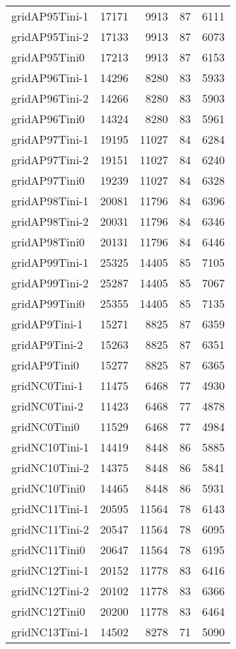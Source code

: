 \begin{longtable}{lrrrr}
gridAP95Tini-1 & 17171 & 9913 & 87 & 6111 \\
gridAP95Tini-2 & 17133 & 9913 & 87 & 6073 \\
gridAP95Tini0 & 17213 & 9913 & 87 & 6153 \\
gridAP96Tini-1 & 14296 & 8280 & 83 & 5933 \\
gridAP96Tini-2 & 14266 & 8280 & 83 & 5903 \\
gridAP96Tini0 & 14324 & 8280 & 83 & 5961 \\
gridAP97Tini-1 & 19195 & 11027 & 84 & 6284 \\
gridAP97Tini-2 & 19151 & 11027 & 84 & 6240 \\
gridAP97Tini0 & 19239 & 11027 & 84 & 6328 \\
gridAP98Tini-1 & 20081 & 11796 & 84 & 6396 \\
gridAP98Tini-2 & 20031 & 11796 & 84 & 6346 \\
gridAP98Tini0 & 20131 & 11796 & 84 & 6446 \\
gridAP99Tini-1 & 25325 & 14405 & 85 & 7105 \\
gridAP99Tini-2 & 25287 & 14405 & 85 & 7067 \\
gridAP99Tini0 & 25355 & 14405 & 85 & 7135 \\
gridAP9Tini-1 & 15271 & 8825 & 87 & 6359 \\
gridAP9Tini-2 & 15263 & 8825 & 87 & 6351 \\
gridAP9Tini0 & 15277 & 8825 & 87 & 6365 \\
gridNC0Tini-1 & 11475 & 6468 & 77 & 4930 \\
gridNC0Tini-2 & 11423 & 6468 & 77 & 4878 \\
gridNC0Tini0 & 11529 & 6468 & 77 & 4984 \\
gridNC10Tini-1 & 14419 & 8448 & 86 & 5885 \\
gridNC10Tini-2 & 14375 & 8448 & 86 & 5841 \\
gridNC10Tini0 & 14465 & 8448 & 86 & 5931 \\
gridNC11Tini-1 & 20595 & 11564 & 78 & 6143 \\
gridNC11Tini-2 & 20547 & 11564 & 78 & 6095 \\
gridNC11Tini0 & 20647 & 11564 & 78 & 6195 \\
gridNC12Tini-1 & 20152 & 11778 & 83 & 6416 \\
gridNC12Tini-2 & 20102 & 11778 & 83 & 6366 \\
gridNC12Tini0 & 20200 & 11778 & 83 & 6464 \\
gridNC13Tini-1 & 14502 & 8278 & 71 & 5090 \\

\end{longtable}
